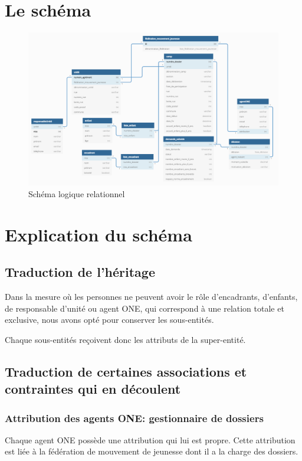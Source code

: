 \section{Le schéma}
\begin{figure}[H]
    \centering
    \includegraphics[width=17cm]{Pictures/modele_lr.png}
    \caption{Schéma logique relationnel}
    \label{fig:modele_lr}
\end{figure}


\section{Explication du schéma}
\subsection{Traduction de l'héritage}
Dans la mesure où les personnes ne peuvent avoir le rôle d'encadrants, d'enfants, de responsable d'unité ou agent ONE, qui correspond à une relation totale et exclusive, nous avons opté pour conserver les sous-entités. 

Chaque sous-entités reçoivent donc les attributs de la super-entité.


\subsection{Traduction de certaines associations et contraintes qui en découlent}
\subsubsection{Attribution des agents ONE: gestionnaire de dossiers}
Chaque agent ONE possède une attribution qui lui est propre. Cette attribution est liée à la fédération de mouvement de jeunesse dont il a la charge des dossiers.
